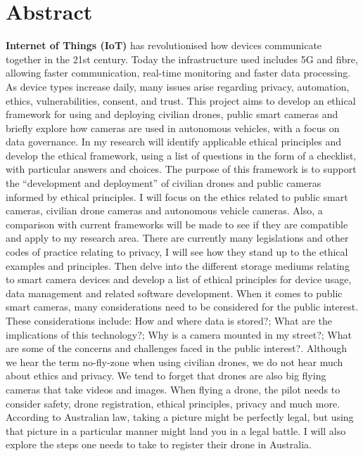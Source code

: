 \section*{Abstract}
\textbf{Internet of Things (IoT) }has revolutionised how devices communicate together in the 21st century. Today the infrastructure used includes 5G and fibre, allowing faster communication, real-time monitoring and faster data processing. As device types increase daily, many issues arise regarding privacy, automation, ethics, vulnerabilities, consent, and trust. This project aims to develop an ethical framework for using and deploying civilian drones, public smart cameras and briefly explore how cameras are used in autonomous vehicles, with a focus on data governance.
\newline
\vspace{4mm} %
In my research will identify applicable ethical principles and develop the ethical framework, using a list of questions in the form of a checklist, with particular answers and choices.  The purpose of this framework is to support the “development and deployment” of civilian drones and public cameras informed by ethical principles. I will focus on the ethics related to public smart cameras, civilian drone cameras and autonomous vehicle cameras. Also, a comparison with current frameworks will be made to see if they are compatible and apply to my research area. There are currently many legislations and other codes of practice relating to privacy, I will see how they stand up to the ethical examples and principles. Then delve into the different storage mediums relating to smart camera devices and develop a list of ethical principles for device usage, data management and related software development.
\newline
\vspace{5mm} %
When it comes to public smart cameras, many considerations need to be considered for the public interest. These considerations include: How and where data is stored?; What are the implications of this technology?; Why is a camera mounted in my street?; What are some of the concerns and challenges faced in the public interest?. 
\newline
\vspace{5mm} %
Although we hear the term no-fly-zone when using civilian drones, we do not hear much about ethics and privacy. We tend to forget that drones are also big flying cameras that take videos and images. When flying a drone, the pilot needs to consider safety, drone registration, ethical principles, privacy and much more. According to Australian law, taking a picture might be perfectly legal, but using that picture in a particular manner might land you in a legal battle. I will also explore the steps one needs to take to register their drone in Australia. 
